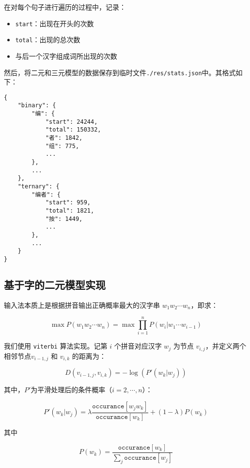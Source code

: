 \documentclass[a4paper]{article}
\begin{document}
在对每个句子进行遍历的过程中，记录：

\begin{itemize}
    \item \texttt{start}：出现在开头的次数
    \item \texttt{total}：出现的总次数
    \item 与后一个汉字组成词所出现的次数
\end{itemize}

然后，将二元和三元模型的数据保存到临时文件\texttt{./res/stats.json}中。其格式如下：

\begin{lstlisting}
{
    "binary": {
        "编": {
            "start": 24244,
            "total": 150332,
            "者": 1842,
            "组": 775,
            ...
        },
        ...
    },
    "ternary": {
        "编者": {
            "start": 959,
            "total": 1821,
            "按": 1449,
            ...
        },
        ...
    }
}
\end{lstlisting}

\subsection{基于字的二元模型实现}

输入法本质上是根据拼音输出正确概率最大的汉字串 $w_1w_2\cdots w_n$，即求：

\begin{equation}\label{eq:1}
    \max{P(w_1w_2\cdots w_n)} = \max\prod_{i=1}^{n}P(w_i|w_1\cdots w_{i-1})
\end{equation}

我们使用 \texttt{viterbi} 算法实现。记第 $i$ 个拼音对应汉字 $w_j$ 为节点 $v_{i,j}$，并定义两个相邻节点$v_{i-1,j}$ 和 $v_{i,k}$ 的距离为：

\begin{equation}\label{eq:2}
    D(v_{i-1,j},v_{i,k}) = -\log(P'(w_{k}|w_{j}))
\end{equation}

其中，$P'$为平滑处理后的条件概率（$i=2,\cdots, n$）：

\begin{equation}\label{eq:3}
    P'(w_{k}|w_{j}) =
        \lambda\frac{\texttt{occurance}[w_{j}w_{k}]}{\texttt{occurance}[w_{k}]}
        + (1-\lambda)P(w_{k})
\end{equation}

其中

\begin{equation}\label{eq:4}
    P(w_{k}) = \frac{\texttt{occurance}[w_{k}]}{\sum_j \texttt{occurance}[w_{j}]}
\end{equation}
\end{document}
